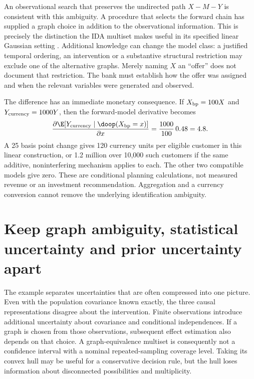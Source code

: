 An observational search that preserves the undirected path $X-M-Y$ is
consistent with this ambiguity. A procedure that selects the forward chain
has supplied a graph choice in addition to the observational information.
This is precisely the distinction the IDA multiset makes useful in its
specified linear Gaussian setting \citep{exec13_pcalg}. Additional knowledge
can change the model class: a justified temporal ordering, an intervention
or a substantive structural restriction may exclude one of the alternative
graphs. Merely naming $X$ an ``offer'' does not document that restriction.
The bank must establish how the offer was assigned and when the relevant
variables were generated and observed.

The difference has an immediate monetary consequence. If $X_{\rm bp}=100X$
and $Y_{\rm currency}=1000Y$, then the forward-model derivative becomes
\begin{equation}
 \frac{\partial\E[Y_{\rm currency}\mid\doop(X_{\rm bp}=x)]}{\partial x}
 =\frac{1000}{100}\,0.48=4.8.
 \label{exec13:units}
\end{equation}
A 25 basis point change gives 120 currency units per eligible customer in
this linear construction, or 1.2 million over 10,000 such customers if the
same additive, noninterfering mechanism applies to each. The other two
compatible models give zero. These are conditional planning calculations,
not measured revenue or an investment recommendation. Aggregation and a
currency conversion cannot remove the underlying identification ambiguity.

\section{Keep graph ambiguity, statistical uncertainty and prior uncertainty apart}

The example separates uncertainties that are often compressed into one
picture. Even with the population covariance known exactly, the three causal
representations disagree about the intervention. Finite observations introduce
additional uncertainty about covariance and conditional independences.
If a graph is chosen from those observations, subsequent effect estimation
also depends on that choice. A graph-equivalence multiset is consequently
not a confidence interval with a nominal repeated-sampling coverage level.
Taking its convex hull may be useful for a conservative decision rule, but
the hull loses information about disconnected possibilities and multiplicity.

